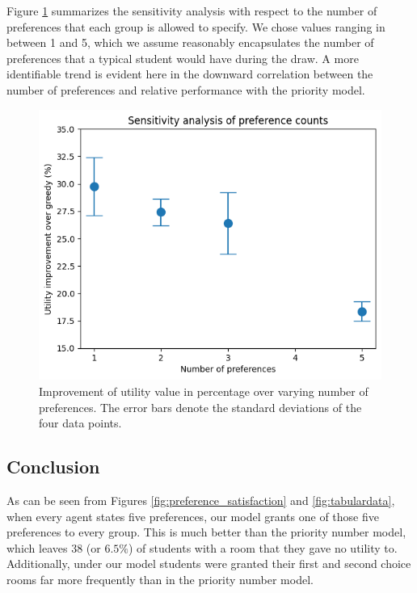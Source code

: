 \documentclass[12pt]{article}
\begin{document}
    Figure \ref{fig:numpref} summarizes the sensitivity analysis with respect to the number of preferences that each group is allowed to specify. We chose values ranging in between 1 and 5, which we assume reasonably encapsulates the number of preferences that a typical student would have during the draw. A more identifiable trend is evident here in the downward correlation between the number of preferences and relative performance with the priority model.
    \begin{figure}[h]
        \centering
        \captionsetup{width=.7\linewidth}
        \includegraphics[scale = 0.65]{res/num_prefs_sensitivity_analysis.png}
        \caption{Improvement of utility value in percentage over varying number of preferences. The error bars denote the standard deviations of the four data points.}
        \label{fig:numpref}
    \end{figure}


    
    \FloatBarrier
    \subsection*{Conclusion}
    As can be seen from Figures \ref{fig:preference_satisfaction} and \ref{fig:tabulardata}, when every agent states five preferences, our model grants one of those five preferences to every group. This is much better than the priority number model, which leaves $38$ (or $6.5\%$) of students with a room that they gave no utility to. Additionally, under our model students were granted their first and second choice rooms far more frequently than in the priority number model. 
\end{document}

